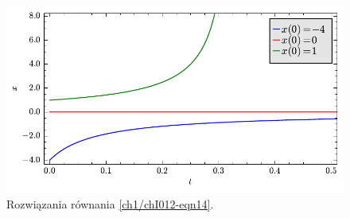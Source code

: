 \documentclass[a4paper,12pt,polish]{sphinxmanual}
\begin{document}
\begin{figure}[htbp]
\centering
\capstart

\includegraphics{sage_chI012_05.pdf}
\caption{Rozwiązania równania \eqref{ch1/chI012-eqn14}.}\end{figure}
\end{document}
